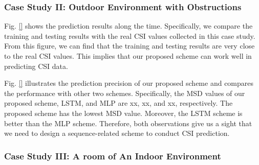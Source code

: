 \documentclass[10pt,journal,cspaper,compsoc]{IEEEtran}
\begin{document}
\subsubsection{Case Study II: Outdoor Environment with Obstructions}
\label{subsubsec:case2}



Fig. \ref{} shows the prediction results along the time. Specifically, we compare the training and testing results with the real CSI values collected in this case study. From this figure, we can find that the training and testing results are very close to the real CSI values. This implies that our proposed scheme can work well in predicting CSI data.


Fig. \ref{} illustrates the prediction precision of our proposed scheme and compares the performance with other two schemes. Specifically, the MSD values of our proposed scheme, LSTM, and MLP are xx, xx, and xx, respectively. The proposed scheme has the lowest MSD value. Moreover, the LSTM scheme is better than the MLP scheme. Therefore, both observations give us a sight that we need to design a sequence-related scheme to conduct CSI prediction.





\subsubsection{Case Study III: A room of An Indoor Environment}
\label{subsec:case3}
\end{document}
